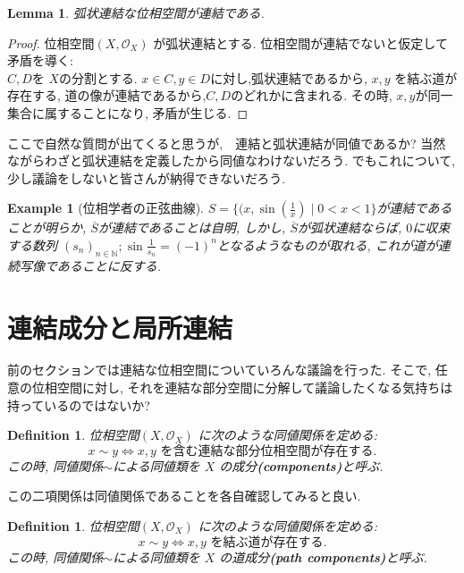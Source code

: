 \documentclass[lualatex]{ltjsbook}
\newcommand{\cl}[1]{\overline{ #1}  }
\newtheorem{lemma}[theorem]{Lemma}
\newtheorem{definition}[theorem]{Definition}
\theoremstyle{remark}
\theoremstyle{plain}
\newtheorem{example}[theorem]{Example}
\begin{document}
\begin{lemma}
	弧状連結な位相空間が連結である.
\end{lemma}

\begin{proof}
	位相空間$\left( X, \mathcal{O}_X \right) $ が弧状連結とする. 
	位相空間が連結でないと仮定して矛盾を導く:　\\
	$C,D$を $X$の分割とする.  
	$x \in C, y \in D$に対し,弧状連結であるから, $x,y$ を結ぶ道が存在する, 
	道の像が連結であるから,$C,D$のどれかに含まれる.
	その時, $x,y$が同一集合に属することになり, 矛盾が生じる.
\end{proof}

ここで自然な質問が出てくると思うが,　連結と弧状連結が同値であるか? 当然ながらわざと弧状連結を定義したから同値なわけないだろう.
でもこれについて, 少し議論をしないと皆さんが納得できないだろう. 

\begin{example}[位相学者の正弦曲線]
	$S=\{(x,\sin (\frac{1}{x})  \mid 0<x< 1\} $が連結であることが明らか,
	$\cl{S}$が連結であることは自明, しかし,  $\cl{S}$が弧状連結ならば,  $0$に収束する数列 $\left( s_n \right) _{n \in \mathbb{N}}; \sin \frac{1}{s_{n}}= (-1)^n$となるようなものが取れる, これが道が連続写像であることに反する.
\end{example}

\section{連結成分と局所連結}

前のセクションでは連結な位相空間についていろんな議論を行った. 
そこで, 任意の位相空間に対し, それを連結な部分空間に分解して議論したくなる気持ちは持っているのではないか?

\begin{definition}
	位相空間$\left( X , \mathcal{O}_{X} \right)$ に次のような同値関係を定める:\\
	$$x \sim y \iff \text{$x,y$ を含む連結な部分位相空間が存在する.}$$
	この時, 同値関係$\sim$による同値類を $X$ の成分\textbf{(components)}と呼ぶ.
\end{definition}

この二項関係は同値関係であることを各自確認してみると良い.

\begin{definition}
	位相空間$\left( X , \mathcal{O}_{X} \right)$ に次のような同値関係を定める:\\
	$$x \sim y \iff \text{$x,y$ を結ぶ道が存在する.}$$
	この時, 同値関係$\sim$による同値類を $X$ の道成分\textbf{(path components)}と呼ぶ.
\end{definition}
\end{document}
